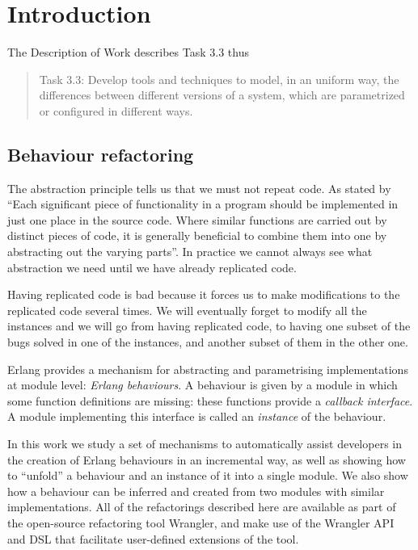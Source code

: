 \section{Introduction}

The Description of Work describes Task 3.3 thus
\begin{quote}
Task 3.3: Develop tools and techniques to model, in an uniform way, the differences between different versions of
a system, which are parametrized or configured in different ways.
\end{quote}

\subsection{Behaviour refactoring}

The abstraction principle tells us that we must not repeat code. As
stated by \cite{pierce2002types} ``Each significant piece of functionality
in a program should be implemented in just one place in the source
code. Where similar functions are carried out by distinct pieces of
code, it is generally beneficial to combine them into one by abstracting
out the varying parts''. In practice we cannot always see what abstraction
we need until we have already replicated code. 

Having replicated code is bad because it forces us to make modifications
to the replicated code several times. We will eventually forget to
modify all the instances and we will go from having replicated code,
to having one subset of the bugs solved in one of the instances, and
another subset of them in the other one.

Erlang provides a mechanism for abstracting and parametrising implementations
at module level: \emph{Erlang behaviours}. A behaviour is given by a module in which 
some function definitions are missing: these functions provide a \emph{callback interface}. A module
implementing this interface is called an \emph{instance} of the behaviour.

In this work we study a set of mechanisms to automatically assist developers in the creation of Erlang behaviours in 
an incremental way, as well as showing how to ``unfold'' a behaviour and an instance of it into a single module. We 
also show how a behaviour can be inferred and created  from two modules with similar implementations. All of the 
refactorings described here are available as part of the open-source refactoring tool Wrangler, and make use of the 
Wrangler API and DSL that facilitate user-defined extensions of the tool. 

